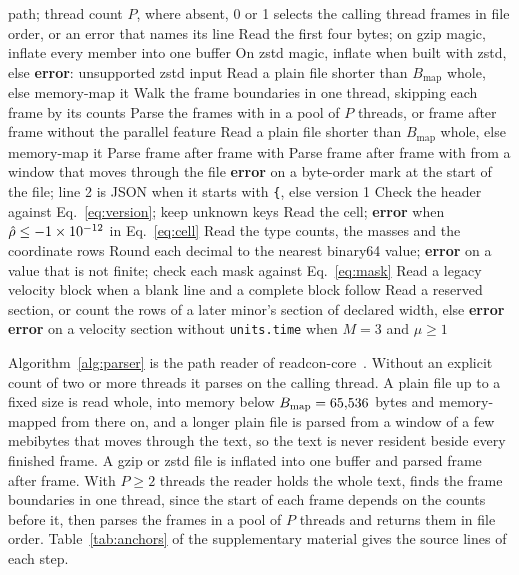 \documentclass[preprint,12pt]{elsarticle}
\begin{document}
\begin{algorithm}[!t] \footnotesize \caption{Read a CON file from a path, as readcon-core~\readconCargoVersion{} does.}
\label{alg:parser} \begin{algorithmic}[1] \Require path; thread count \(P\), where absent, 0 or 1 selects the calling thread \Ensure frames in file order, or an error that names its line \State Read the first four bytes; on gzip magic, inflate every member into one buffer \State On zstd magic, inflate when built with zstd, else \textbf{error}: unsupported zstd input  \State Read a plain file shorter than \(B_{\mathrm{map}}\) whole, else memory-map it \State Walk the frame boundaries in one thread, skipping each frame by its counts \State Parse the frames with  in a pool of \(P\) threads, or frame after frame without the parallel feature  \State Read a plain file shorter than \(B_{\mathrm{map}}\) whole, else memory-map it \State Parse frame after frame with  \Else \State Parse frame after frame with  from a window that moves through the file \EndIf {} \State \textbf{error} on a byte-order mark at the start of the file; line 2 is JSON when it starts with \texttt{\{}, else version 1 \State Check the header against Eq.~\eqref{eq:version}; keep unknown keys \State Read the cell; \textbf{error} when \(\hat\rho\le-\num{1e-12}\) in Eq.~\eqref{eq:cell} \State Read the type counts, the masses and the coordinate rows \State Round each decimal to the nearest binary64 value; \textbf{error} on a value that is not finite; check each mask against Eq.~\eqref{eq:mask}  \State Read a legacy velocity block when a blank line and a complete block follow \Else {} \State Read a reserved section, or count the rows of a later minor's section of declared width, else \textbf{error} \EndFor \EndIf \State \textbf{error} on a velocity section without \texttt{units.time} when \(M=3\) and \(\mu\ge 1\) \EndFunction \end{algorithmic} \end{algorithm} %
Algorithm~\ref{alg:parser} is the path reader of readcon-core~\readconCargoVersion{}.
Without an explicit count of two or more threads it parses on the calling thread.
A plain file up to a fixed size is read whole, into memory below \(B_{\mathrm{map}}=65{,}536\) bytes and memory-mapped from there on, and a longer plain file is parsed from a window of a few mebibytes that moves through the text, so the text is never resident beside every finished frame.
A gzip or zstd file is inflated into one buffer and parsed frame after frame.
With \(P\ge2\) threads the reader holds the whole text, finds the frame boundaries in one thread, since the start of each frame depends on the counts before it, then parses the frames in a pool of \(P\) threads and returns them in file order.
Table~\ref*{tab:anchors} of the supplementary material gives the source lines of each step.
\end{document}
